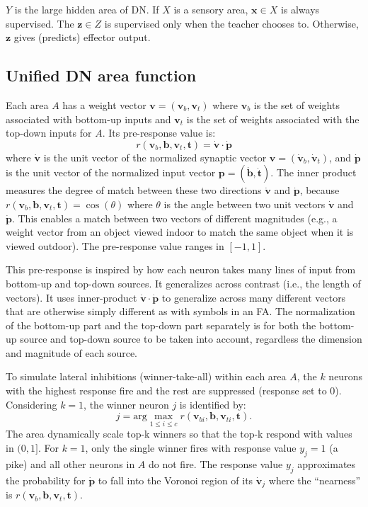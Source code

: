 \documentclass[conference]{IEEEtran}
\def\b{\mathbf b}
\def\p{\mathbf p}
\def\t{\mathbf t}
\def\v{\mathbf v}
\def\x{\mathbf x}
\def\z{\mathbf z}
\begin{document}
$Y$ is the large hidden area of DN.  If $X$ is a sensory area, $\x \in X$ is always supervised. The $\z \in Z$ is supervised only when the teacher chooses to.   Otherwise, $\z$ gives (predicts) effector output.  

\subsection{Unified DN area function}
Each area $A$ has a weight vector $\v= (\v_b, \v_t)$ where $\v_b$ is the set of weights associated with bottom-up inputs and $\v_t$ is the set of weights associated with the top-down inputs for $A$.  Its pre-response value is:
\begin{equation}
\label{EQ:pre-response}
r (\v_b, \b, \v_t, \t)  
= \dot{\v} \cdot \dot{\p}
\end{equation}
where
$\dot{\v}$ is the unit vector of the normalized synaptic vector 
$\v= (\dot{\v}_b, \dot{\v}_t)$, and $\dot{\p}$ is the unit vector of the normalized input vector 
$\p= (\dot{\b}, \dot{\t})$.    The inner product measures the degree of match between these two directions 
$\dot{\v}$ and $\dot{\p}$, because $r (\v_b, \b, \v_t, \t) = \cos(\theta) $ where $\theta$ is the angle between 
two unit vectors $\dot{\v}$ and $\dot{\p}$.
This enables a match between two vectors of different magnitudes (e.g., a weight vector from an object viewed indoor to match the same object when it is viewed  outdoor). 
The pre-response value ranges in $[-1, 1]$.

This pre-response is inspired by how each neuron takes many lines of input from bottom-up and top-down sources.  It generalizes across contrast (i.e., the length of vectors).   It uses inner-product $\dot{\v} \cdot \dot{\p}$ to
generalize across many different vectors that are otherwise simply different as with symbols in an FA.  The normalization of the bottom-up part and the top-down part separately is for both the bottom-up source and top-down source
to be taken into account, regardless the dimension and magnitude of each source. 

To simulate lateral inhibitions (winner-take-all) within each area $A$, the $k$ neurons with the highest response fire and the rest are suppressed (response set to 0).  Considering $k=1$, the winner neuron $j$ is identified by:
\begin{equation}
j = \mbox{arg}\max_{1\le i \le c}  r (\v_{bi}, \b, \v_{ti}, \t) .
\label{EQ:jmax}
\end{equation}
The area dynamically scale top-k winners so that the top-k respond with values in $(0, 1]$.   
For $k=1$, only the single winner fires with response value 
$y_j=1$ (a pike) and all other neurons in $A$ do not fire.  The response value $y_j$ approximates the 
probability for $\dot{\p} $ to fall into the Voronoi region of its $\dot{\v}_j$ where the ``nearness'' 
is $r (\v_b, \b, \v_t, \t)$.
\end{document}
